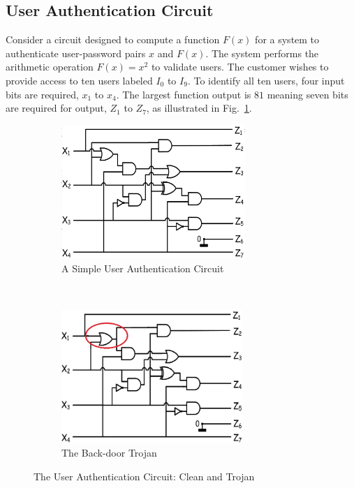 \subsection{User Authentication Circuit} \label{sec:userAuthentication}
Consider a circuit designed to compute a function $F(x)$ for a system to authenticate user-password pairs $x$ and $F(x)$.
The system performs the arithmetic operation $F(x) = x^2$ to validate users.
The customer wishes to provide access to ten users labeled $I_0$ to $I_9$.
To identify all ten users, four input bits are required, $x_1$ to $x_4$.
The largest function output is $81$ meaning seven bits are required for output, $Z_1$ to $Z_7$, as illustrated in Fig.~\ref{fig:userAuthenticationCircuit}.
\begin{figure}[h]
	\centering
	\begin{subfigure}[t]{0.5\textwidth}
		\centering
		\includegraphics[height=2in]{Figures/circuit1}
		\caption{A Simple User Authentication Circuit}
		\label{fig:userAuthenticationCircuit}
	\end{subfigure}%
	~ 
	\begin{subfigure}[t]{0.5\textwidth}
		\centering
		\includegraphics[height=2in]{Figures/circuit2}
		\caption{The Back-door Trojan}
		\label{fig:userAuthenticationCircuitTrojan}
	\end{subfigure}
	\caption{The User Authentication Circuit: Clean and Trojan}
	\label{fig:userAuthentication}
\end{figure}
